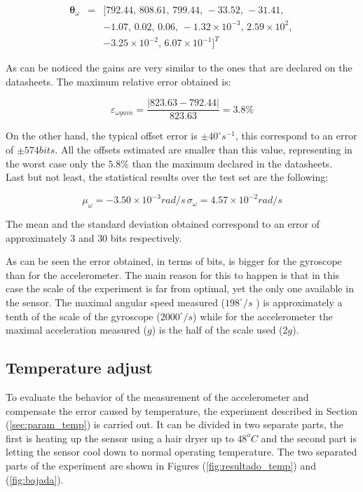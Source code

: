 \documentclass[conference]{IEEEtran}
\newcommand{\refp}[1]{(\ref{#1})}
\begin{document}
\begin{eqnarray}
\boldsymbol{\theta}_\omega &=& [792.44,\, 808.61, \, 799.44, \, -33.52, \, -31.41, \\ \nonumber
& & -1.07, \, 0.02, \, 0.06, \, -1.32 \times 10^{-3}, \, 2.59\times 10^{2}, \, \\ \nonumber
& & -3.25 \times 10^{-2}, \, 6.07\times 10^{-1}]^T \nonumber
\end{eqnarray}

As can be noticed the gains are very similar to the ones that are declared on the datasheets. The maximum relative error obtained is:

\begin{equation}
\varepsilon_{\omega gain} = \frac{|823.63 - 792.44|}{823.63} = 3.8 \%
\end{equation}

On the other hand, the typical offset error is $\pm 40 ^\circ s^{-1}$, this correspond to an error of $\pm 574 bits$. All the offsets estimated are smaller than this value, representing in the worst case only the $5.8 \%$ than the maximum declared in the datasheets. \\

Last but not least, the statistical results over the test set are the following:

\begin{equation}
\mu_\omega = -3.50 \times 10^{-3} rad/s\, \sigma_\omega = 4.57 \times 10^{-2} rad/s
\end{equation}

The mean and the standard deviation obtained correspond to an error of approximately $3$ and $30$ bits respectively. 

As can be seen the error obtained, in terms of bits, is bigger for the gyroscope than for the accelerometer. The main reason for this to happen is that in this case the scale of the experiment is far from optimal, yet the only one available in the sensor. The maximal angular speed measured ($198 ^{\circ} /s$ ) is approximately a tenth of the scale of the gyroscope ($2000^{\circ} /s$) while for the accelerometer the maximal acceleration measured ($g$) is the half of the scale used ($2 g$). 

\subsection{Temperature adjust}

To evaluate the behavior of the measurement of the accelerometer and compensate the error caused by temperature, the experiment described in Section \refp{sec:param_temp} is carried out. It can be divided in two separate parts, the first is heating up the sensor using a hair dryer up to $48^oC$ and the second part is letting the sensor cool down to normal operating temperature. The two separated parts of the experiment are shown in Figures \refp{fig:resultado_temp} and \refp{fig:bajada}.
\end{document}
